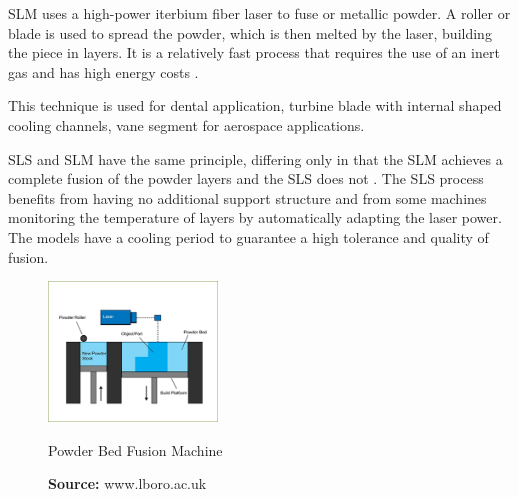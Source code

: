 SLM uses a high-power iterbium fiber laser to fuse or metallic powder\cite{udroiu2012powder}.  A roller or blade is used to spread the powder, which is then melted by the laser, building the piece in layers. It is a relatively fast process that requires the use of an inert gas and has high energy costs \cite{lboropbf}.\par
This technique is used for dental application, turbine blade with internal shaped cooling channels, vane segment for aerospace applications. \cite{udroiu2012powder}\par
SLS and SLM have the same principle, differing only in that the SLM achieves a complete fusion of the powder layers and the SLS does not \cite{wagner2016additive}. The SLS process benefits from having no additional support structure and from some machines monitoring the temperature of layers by automatically adapting the laser power. The models have a cooling period to guarantee a high tolerance and quality of fusion. \cite{lboropbf}
\begin{figure}[h]
\centering
\includegraphics[width=0.4\textwidth]{./Images/PBF.jpg}
\caption{Powder Bed Fusion Machine}
\label{PBF}
\caption*{\textbf{Source:} www.lboro.ac.uk}
\end{figure}
\\

